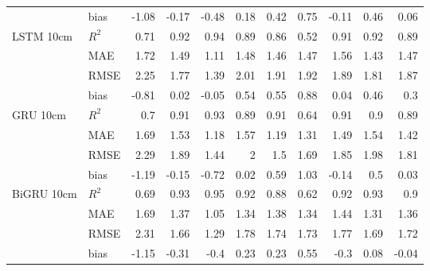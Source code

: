 \begin{tabular}{llrrrrrrrrr}
                                     & bias  & -1.08 & -0.17 & -0.48 & 0.18 & 0.42 &  0.75 & -0.11 & 0.46 &      0.06 \\
 LSTM 10cm                           & $R^2$ &  0.71 &  0.92 &  0.94 & 0.89 & 0.86 &  0.52 &  0.91 & 0.92 &      0.89 \\
                                     & MAE   &  1.72 &  1.49 &  1.11 & 1.48 & 1.46 &  1.47 &  1.56 & 1.43 &      1.47 \\
                                     & RMSE  &  2.25 &  1.77 &  1.39 & 2.01 & 1.91 &  1.92 &  1.89 & 1.81 &      1.87 \\
                                     & bias  & -0.81 &  0.02 & -0.05 & 0.54 & 0.55 &  0.88 &  0.04 & 0.46 &      0.3  \\
 GRU 10cm                            & $R^2$ &  0.7  &  0.91 &  0.93 & 0.89 & 0.91 &  0.64 &  0.91 & 0.9  &      0.89 \\
                                     & MAE   &  1.69 &  1.53 &  1.18 & 1.57 & 1.19 &  1.31 &  1.49 & 1.54 &      1.42 \\
                                     & RMSE  &  2.29 &  1.89 &  1.44 & 2    & 1.5  &  1.69 &  1.85 & 1.98 &      1.81 \\
                                     & bias  & -1.19 & -0.15 & -0.72 & 0.02 & 0.59 &  1.03 & -0.14 & 0.5  &      0.03 \\
 BiGRU 10cm                          & $R^2$ &  0.69 &  0.93 &  0.95 & 0.92 & 0.88 &  0.62 &  0.92 & 0.93 &      0.9  \\
                                     & MAE   &  1.69 &  1.37 &  1.05 & 1.34 & 1.38 &  1.34 &  1.44 & 1.31 &      1.36 \\
                                     & RMSE  &  2.31 &  1.66 &  1.29 & 1.78 & 1.74 &  1.73 &  1.77 & 1.69 &      1.72 \\
                                     & bias  & -1.15 & -0.31 & -0.4  & 0.23 & 0.23 &  0.55 & -0.3  & 0.08 &     -0.04 \\
\hline
\end{tabular}